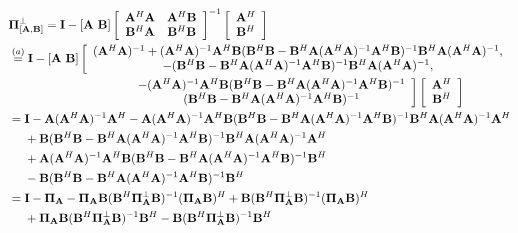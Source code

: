 \documentclass[11pt, draft, onecolumn ]{IEEEtran}
\begin{document}
         \begin{align*}
            &\Pibf_{[\Abf,\Bbf]}^\bot =
            \Ibf - [\Abf ~\Bbf] \left[
              \begin{array}{cc}
                \Abf^H \Abf & \Abf^H \Bbf \\
                \Bbf^H \Abf & \Bbf^H \Bbf \\
              \end{array}
            \right]^{-1} \left[
              \begin{array}{c}
                \Abf^H \\
                \Bbf^H \\
              \end{array}
            \right]     \\
             &  \stackrel{(a)}{=}\Ibf - [\Abf ~ \Bbf] \left[
              \begin{array}{c}
                (\Abf^H \Abf)^{-1} + (\Abf^H \Abf)^{-1}\Abf^H \Bbf (\Bbf^H\Bbf - \Bbf^H \Abf (\Abf^H \Abf)^{-1}\Abf^H \Bbf)^{-1} \Bbf^H \Abf (\Abf^H \Abf)^{-1},  \\
                -(\Bbf^H \Bbf - \Bbf^H \Abf (\Abf^H \Abf)^{-1} \Abf^H \Bbf)^{-1} \Bbf^H \Abf (\Abf^H \Abf)^{-1}, \\
              \end{array}
            \right. \\
            &   \hspace{10em} \left.
            \begin{array}{c}
             - (\Abf^H \Abf)^{-1}\Abf^H \Bbf(\Bbf^H \Bbf - \Bbf^H \Abf(\Abf^H \Abf)^{-1}\Abf^H\Bbf)^{-1} \\
               (\Bbf^H \Bbf - \Bbf^H \Abf (\Abf^H \Abf)^{-1} \Abf^H \Bbf )^{-1}
            \end{array}
            \right]
            \left[
              \begin{array}{c}
                \Abf^H \\
                \Bbf^H \\
              \end{array}
            \right]\\
            &= \Ibf - \Abf (\Abf^H \Abf)^{-1}\Abf^H - \Abf(\Abf^H \Abf)^{-1}\Abf^H \Bbf (\Bbf^H\Bbf - \Bbf^H \Abf (\Abf^H \Abf)^{-1}\Abf^H \Bbf)^{-1} \Bbf^H \Abf (\Abf^H \Abf)^{-1}\Abf^H \\
            &~~~~ + \Bbf(\Bbf^H \Bbf - \Bbf^H \Abf (\Abf^H \Abf)^{-1} \Abf^H \Bbf)^{-1} \Bbf^H \Abf (\Abf^H \Abf)^{-1} \Abf^H \\
            &~~~~ +  \Abf(\Abf^H \Abf)^{-1}\Abf^H \Bbf(\Bbf^H \Bbf - \Bbf^H \Abf(\Abf^H \Abf)^{-1}\Abf^H\Bbf)^{-1}\Bbf^H \\
            &~~~~ - \Bbf (\Bbf^H \Bbf - \Bbf^H \Abf (\Abf^H \Abf)^{-1} \Abf^H \Bbf)^{-1} \Bbf^H \\
            &=  \Ibf -  \Pibf_{\Abf}   -  \Pibf_{\Abf}\Bbf (\Bbf^H\Pibf_{\Abf}^\bot\Bbf)^{-1} ( \Pibf_{\Abf}\Bbf )^H  + \Bbf (\Bbf^H \Pibf_{\Abf}^\bot\Bbf)^{-1} (\Pibf_{\Abf}\Bbf)^H\\
            &~~~~ +  \Pibf_{\Abf}\Bbf(\Bbf^H \Pibf_{\Abf}^\bot\Bbf)^{-1}\Bbf^H - \Bbf (\Bbf^H \Pibf_{\Abf}^\bot\Bbf)^{-1} \Bbf^H
            \end{align*}
\end{document}
